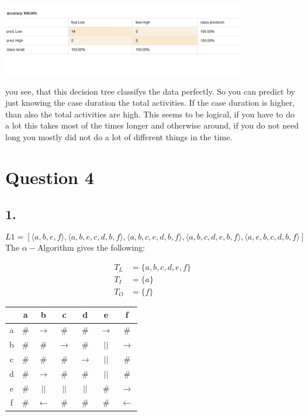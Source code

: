 \documentclass{article}
\begin{document}
\includegraphics[width=0.8\textwidth]{Question3Confusion.jpg}

you see, that this decision tree classifys the data perfectly. So you can
predict by just knowing the case duration the total activities. If the case
duration is higher, than also the total activities are high. This seems to be
logical, if you have to do a lot this takes most of the times longer and
otherwise around, if you do not need long you mostly did not do a lot of
different things in the time.

\section*{Question 4}
\subsection*{1.}
\begin{equation*}
L1= [\langle a,b,e,f\rangle ,\langle a,b,e,c,d,b,f\rangle ,\langle a,b,c,e,d,b
,f\rangle ,\langle a,b,c,d,e,b,f\rangle ,\langle a,e,b,c,d,b,f\rangle ]
\end{equation*}
The $\alpha-$Algorithm gives the following:

\begin{align*}
T_L &= \{ a,b,c,d,e,f\}\\
T_I &= \{a\}\\
T_O &= \{f\}
\end{align*}
\begin{tabular}{c | c c c c c c}
	&a 	  &b 			 &c 			&d 	  			&e 			   &f\\
	\hline
a	&$\#$ &$\rightarrow$ &$\#$ 			&$\#$ 			&$\rightarrow$ &$\#$\\
b	&$\#$ &$\#$			 &$\rightarrow$ &$\#$ 			&$||$ 		   &$\rightarrow$\\
c	&$\#$ &$\#$			 &$\#$			&$\rightarrow$  &$||$ 		   &$\#$\\
d	&$\#$ &$\rightarrow$ &$\#$			&$\#$			&$||$ 		   &$\#$\\
e	&$\#$ &$||$ 		 &$||$			&$||$  			&$\#$		   &$\rightarrow$\\
f	&$\#$ &$\leftarrow$	 &$\#$			&$\#$			&$\#$		   &$\leftarrow$\\
\end{tabular}
\end{document}
